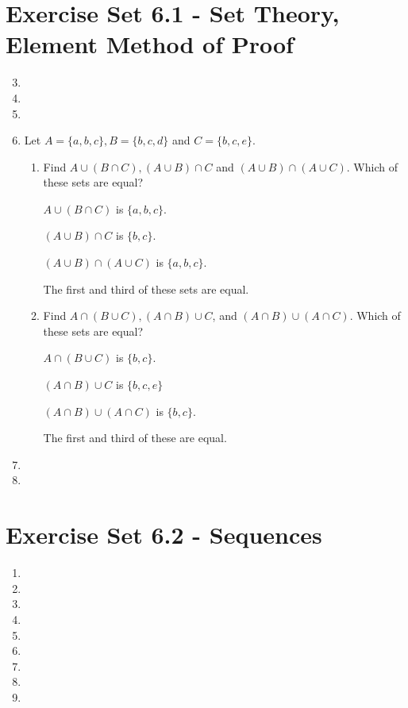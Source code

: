 \documentclass[12pt]{article}
\begin{document}

\setcounter{section}{6}
\section*{Exercise Set 6.1 - Set Theory, Element Method of Proof}
\begin{enumerate}
  \setcounter{enumi}{2}
\item %
  \setcounter{enumi}{4}
\item %
  \setcounter{enumi}{8}
\item %
  \setcounter{enumi}{15}
\item %
Let $A = \{a,b,c\}, B = \{b,c,d\}$ and $C = \{b,c,e\}$.
\begin{enumerate}
\item Find $A \cup (B \cap C), (A \cup B) \cap C$ and $(A \cup B) \cap (A \cup C)$. Which of these sets are
  equal?

$A \cup (B \cap C)$ is $\{a,b,c\}$.

$(A \cup B) \cap C$ is $\{b,c\}$.

$(A \cup B) \cap (A \cup C)$ is $\{a,b,c\}$.

The first and third of these sets are equal.
\item Find $A \cap (B \cup C), (A \cap B) \cup C$, and $(A \cap B) \cup (A \cap C)$. Which of these sets are
  equal?

$A \cap (B \cup C)$ is $\{b,c\}$.

$(A \cap B) \cup C$ is $\{b,c,e\}$

$(A \cap B) \cup (A \cap C)$ is $\{b,c\}$.

The first and third of these are equal.

\end{enumerate}
  \setcounter{enumi}{18}
\item %
  \setcounter{enumi}{21}
\item %
\end{enumerate}
\section*{Exercise Set 6.2 - Sequences}
\begin{enumerate}
\item %
\setcounter{enumi}{6}
\item %
\item %
\item %

\setcounter{enumi}{11}
\item %
\item %
\setcounter{enumi}{15}
\item %
\setcounter{enumi}{24}
\item %
\setcounter{enumi}{33}
\item %

\end{enumerate}
\end{document}
